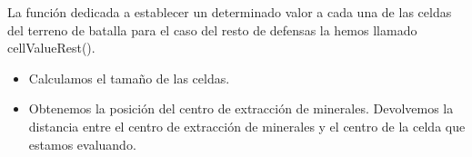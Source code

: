 La función dedicada a establecer un determinado valor a cada una de las celdas del terreno de batalla para el caso del resto de defensas la hemos llamado cellValueRest().
\begin{itemize}
\item Calculamos el tamaño de las celdas.
\item Obtenemos la posición del centro de extracción de minerales.
\iten Devolvemos la distancia entre el centro de extracción de minerales y el centro de la celda que estamos evaluando.
\end{itemize}